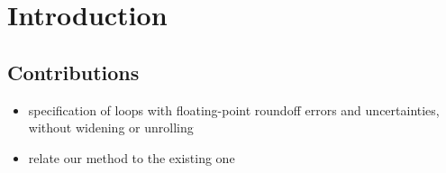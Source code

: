 \section{Introduction}

\subsection{Contributions}

\begin{itemize}

\item specification of loops with floating-point roundoff errors and uncertainties,
without widening or unrolling

\item relate our method to the existing one

\end{itemize}
